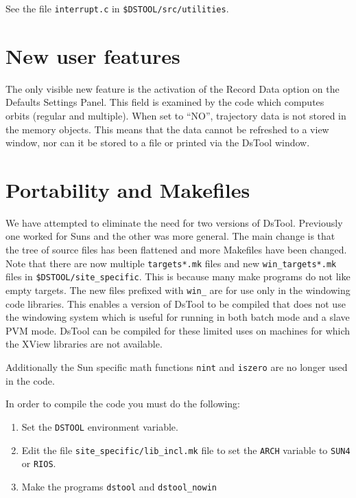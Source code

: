 See the file {\tt interrupt.c} in {\tt \$DSTOOL/src/utilities}.


\section{New user features}

The only visible new feature is the activation of the Record Data option
on the Defaults Settings Panel.  This field is examined by the code
which computes orbits (regular and multiple).  When set to ``NO'',
trajectory data is not stored in the memory objects.  This means
that the data cannot be refreshed to a view window, nor can it be stored
to a file or printed via the DsTool window.


\section{Portability and Makefiles}

We have attempted to eliminate the need for two versions of
DsTool.  Previously one worked for Suns and the other was more general.
The main change is that the tree of source files has been flattened
and more Makefiles have been changed.  
Note that there are now multiple {\tt targets*.mk} files and
new {\tt win\_targets*.mk} files in {\tt \$DSTOOL/site\_specific}.
This is because many make programs do not like empty targets.
The new files prefixed with {\tt win\_} are for use only in the
windowing code libraries.  This enables a version of DsTool to be compiled
that does not use the windowing system which is useful for running
in both batch mode and a slave PVM mode.  DsTool can be compiled for
these limited uses on machines for which the XView libraries are not
available.

Additionally the Sun specific
math functions {\tt nint} and {\tt iszero} are no longer used in the code.

In order to compile the code you must do the following:
\begin{enumerate}
\item Set the {\tt DSTOOL} environment variable.
\item Edit the file {\tt site\_specific/lib\_incl.mk} file to
set the {\tt ARCH} variable to {\tt SUN4} or {\tt RIOS}.
\item Make the programs {\tt dstool} and {\tt dstool\_nowin}
\end{enumerate}


 




